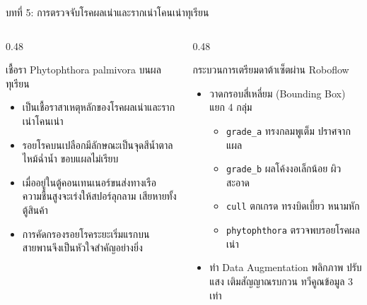 \documentclass[aspectratio=169, 10pt]{beamer}
\begin{document}
\begin{frame}{บทที่ 5: การตรวจจับโรคผลเน่าและรากเน่าโคนเน่าทุเรียน}
\begin{columns}[T]
    \begin{column}{0.48\textwidth}
        \begin{mastercard}{เชื้อรา Phytophthora palmivora บนผลทุเรียน}
            \begin{itemize}
                \item เป็นเชื้อราสาเหตุหลักของโรคผลเน่าและรากเน่าโคนเน่า
                \item รอยโรคบนเปลือกมีลักษณะเป็นจุดสีน้ำตาลไหม้ฉ่ำน้ำ ขอบแผลไม่เรียบ
                \item เมื่ออยู่ในตู้คอนเทนเนอร์ขนส่งทางเรือ ความชื้นสูงจะเร่งให้สปอร์ลุกลาม เสียหายทั้งตู้สินค้า
                \item การคัดกรองรอยโรคระยะเริ่มแรกบนสายพานจึงเป็นหัวใจสำคัญอย่างยิ่ง
            \end{itemize}
        \end{mastercard}
    \end{column}
    \begin{column}{0.48\textwidth}
        \begin{goldcard}{กระบวนการเตรียมดาต้าเซ็ตผ่าน Roboflow}
            \begin{itemize}
                \item วาดกรอบสี่เหลี่ยม (Bounding Box) แยก 4 กลุ่ม
                \begin{itemize}
                    \item \texttt{grade\_a} ทรงกลมพูเต็ม ปราศจากแผล
                    \item \texttt{grade\_b} ผลโค้งงอเล็กน้อย ผิวสะอาด
                    \item \texttt{cull} ตกเกรด ทรงบิดเบี้ยว หนามหัก
                    \item \texttt{phytophthora} ตรวจพบรอยโรคผลเน่า
                \end{itemize}
                \item ทำ Data Augmentation พลิกภาพ ปรับแสง เติมสัญญาณรบกวน ทวีคูณข้อมูล 3 เท่า
            \end{itemize}
        \end{goldcard}
    \end{column}
\end{columns}
\end{frame}
\end{document}
